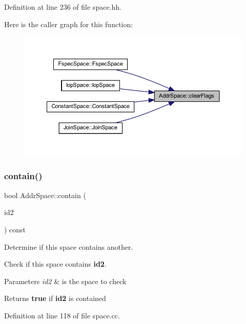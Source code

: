 Definition at line 236 of file space.\+hh.

Here is the caller graph for this function\+:
\nopagebreak
\begin{figure}[H]
\begin{center}
\leavevmode
\includegraphics[width=350pt]{class_addr_space_a523bc5940337efda7c00745c06c4346f_icgraph}
\end{center}
\end{figure}
\mbox{\label{class_addr_space_a029e10332bf92db61ae25a456c994dd6}} 
\subsubsection{\texorpdfstring{contain()}{contain()}}
{\footnotesize\ttfamily bool Addr\+Space\+::contain (\begin{DoxyParamCaption}\item[{\mbox{\hyperlink{class_addr_space}{Addr\+Space}} $\ast$}]{id2 }\end{DoxyParamCaption}) const}



Determine if this space contains another. 

Check if this space contains {\bfseries{id2}}. 
\begin{DoxyParams}{Parameters}
{\em id2} & is the space to check \\
\hline
\end{DoxyParams}
\begin{DoxyReturn}{Returns}
{\bfseries{true}} if {\bfseries{id2}} is contained 
\end{DoxyReturn}


Definition at line 118 of file space.\+cc.

